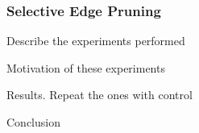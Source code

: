 \subsubsection{Selective Edge Pruning} \label{N_I:s_exp_edge_pruning}


\begin{todolist}
  \item Describe the experiments performed
  \item Motivation of these experiments
  \item Results. Repeat the ones with control
  \item Conclusion
\end{todolist}
